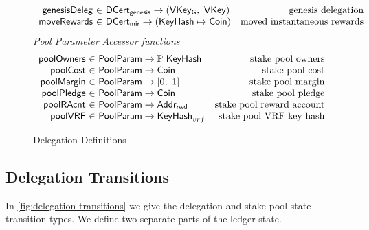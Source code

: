 \begin{figure}[htb]
\begin{equation*}
\begin{array}{r@{~\in~}lr}
      \fun{genesisDeleg} & \DCertGen \to (\VKeyGen,~\VKey)
                                            & \text{genesis delegation}
      \\
      \fun{moveRewards} & \DCertMir \to (\KeyHash \mapsto \Coin)
                                            & \text{moved instantaneous rewards}
    \end{array}
  \end{equation*}
  \emph{Pool Parameter Accessor functions}
  \begin{equation*}
  \begin{array}{r@{~\in~}lr}
    \fun{poolOwners} & \PoolParam \to \powerset{\KeyHash}
                     & \text{stake pool owners}
    \\
    \fun{poolCost} & \PoolParam \to \Coin
                     & \text{stake pool cost}
    \\
    \fun{poolMargin} & \PoolParam \to \unitInterval
                     & \text{stake pool margin}
    \\
    \fun{poolPledge} & \PoolParam \to \Coin
                     & \text{stake pool pledge}
    \\
    \fun{poolRAcnt} & \PoolParam \to \AddrRWD
                     & \text{stake pool reward account}
    \\
    \fun{poolVRF} & \PoolParam \to \KeyHash_{vrf}
                  & \text{stake pool VRF key hash}
    \\
  \end{array}
  \end{equation*}

  \caption{Delegation Definitions}
  \label{fig:delegation-defs}
\end{figure}

\clearpage

\subsection{Delegation Transitions}
\label{sec:deleg-trans}


In \cref{fig:delegation-transitions} we give the delegation and stake pool
state transition types. We define two separate parts of the ledger state.

